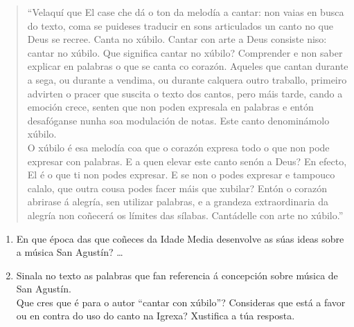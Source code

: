 \begin{quote}
\small{
``Velaquí que El case che dá o ton da melodía a cantar: non vaias en busca
do texto, coma se puideses traducir en sons articulados un canto no que
Deus se recree. Canta no xúbilo. Cantar con arte a Deus consiste niso:
cantar no xúbilo. Que significa cantar no xúbilo? Comprender e non saber
explicar en palabras o que se canta co corazón. Aqueles que cantan
durante a sega, ou durante a vendima, ou durante calquera outro
traballo, primeiro advirten o pracer que suscita o texto dos cantos,
pero máis tarde, cando a emoción crece, senten que non poden expresala
en palabras e entón desafóganse nunha soa modulación de notas. Este
canto denominámolo xúbilo.\\
O xúbilo é esa melodía coa que o corazón expresa todo o que non pode
expresar con palabras. E a quen elevar este canto senón a Deus? En
efecto, El é o que ti non podes expresar. E se non o podes expresar e
tampouco calalo, que outra cousa podes facer máis que xubilar? Entón o
corazón abrirase á alegría, sen utilizar palabras, e a grandeza
extraordinaria da alegría non coñecerá os límites das sílabas.
Cantádelle con arte no xúbilo.''
}
\end{quote}
%
\begin{ejercicio}
  \begin{enumerate}[1.-]
  \item
    En que época das que coñeces da Idade Media desenvolve as súas ideas sobre a música San Agustín? \ldots
  \item
    Sinala no texto as palabras que fan referencia á concepción sobre música de San Agustín. \\
    Que cres que é para o autor ``cantar con xúbilo''? Consideras que está 
a favor ou en contra do uso do canto na Igrexa? Xustifica a túa resposta.
    \vspace*{3.10cm}
  \end{enumerate}
\end{ejercicio}
